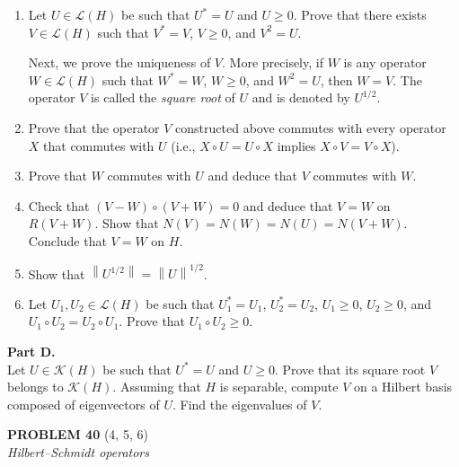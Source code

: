 \documentclass[12pt]{article}
\newcommand{\norm}[1]{\left\|#1\right\|}
\begin{document}
\begin{enumerate}
\item Let $U \in \mathcal{L}(H)$ be such that $U^* = U$ and $U \ge 0$. Prove that there exists
$V \in \mathcal{L}(H)$ such that $V^* = V$, $V \ge 0$, and $V^2 = U$.
 
\noindent[\textit{Hint:} Apply the construction of part B to $T = U/\norm{U}$.]
 
Next, we prove the uniqueness of $V$. More precisely, if $W$ is any operator
$W \in \mathcal{L}(H)$ such that $W^* = W$, $W \ge 0$, and $W^2 = U$, then $W = V$. The operator
$V$ is called the \emph{square root} of $U$ and is denoted by $U^{1/2}$.
 
\item Prove that the operator $V$ constructed above commutes with every operator $X$
that commutes with $U$ (i.e., $X \circ U = U \circ X$ implies $X \circ V = V \circ X$).
 
\item Prove that $W$ commutes with $U$ and deduce that $V$ commutes with $W$.
 
\item Check that $(V - W) \circ (V + W) = 0$ and deduce that $V = W$ on $R(V+W)$.
Show that $N(V) = N(W) = N(U) = N(V+W)$. Conclude that $V = W$ on $H$.
 
\noindent[\textit{Hint:} Note that $V = W$ on $R(V+W) = N(U)^\perp$, and that $V = W = 0$ on $N(U)$.]
 
\item Show that $\norm{U^{1/2}} = \norm{U}^{1/2}$.
 
\item Let $U_1, U_2 \in \mathcal{L}(H)$ be such that $U_1^* = U_1$, $U_2^* = U_2$, $U_1 \ge 0$, $U_2 \ge 0$,
and $U_1 \circ U_2 = U_2 \circ U_1$. Prove that $U_1 \circ U_2 \ge 0$.
 
\end{enumerate}
 
\noindent\textbf{Part D.}\\
Let $U \in \mathcal{K}(H)$ be such that $U^* = U$ and $U \ge 0$. Prove that its square root
$V$ belongs to $\mathcal{K}(H)$. Assuming that $H$ is separable, compute $V$ on a Hilbert basis
composed of eigenvectors of $U$. Find the eigenvalues of $V$.
 
\bigskip
 
\noindent\textbf{PROBLEM 40} (4, 5, 6)\\[4pt]
\textit{Hilbert--Schmidt operators}
 
\end{document}
